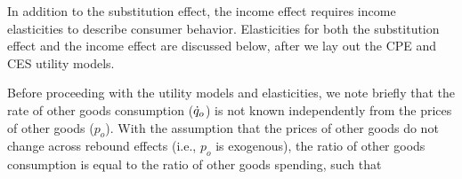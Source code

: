 \documentclass[12pt]{article}\usepackage[]{graphicx}\usepackage[]{xcolor}
\begin{document}
In addition to the substitution effect,
the income effect requires income elasticities
to describe consumer behavior. 
Elasticities for both the substitution effect and the income effect
are discussed below, 
after we lay out the CPE and CES utility models.





Before proceeding with the utility models and elasticities,
we note briefly that the rate of other goods consumption ($\dot{q}_o$)
is not known independently from the prices of other goods ($p_o$).
With the assumption that the prices of other goods do not change
across rebound effects
(i.e., $p_o$ is exogenous), 
the ratio of other goods consumption is equal to 
the ratio of other goods spending, such that
\end{document}
